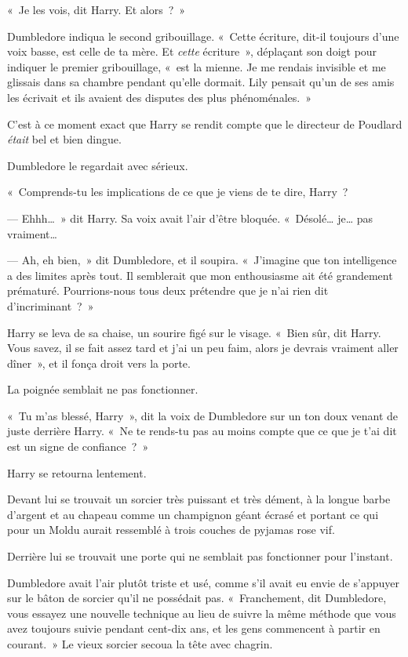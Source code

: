 «~Je les vois, dit Harry.
Et alors~?~»

Dumbledore indiqua le second gribouillage.
«~Cette écriture, dit-il toujours d'une voix basse, est celle de ta mère.
Et \emph{cette} écriture~», déplaçant son doigt pour indiquer le premier gribouillage, «~est la mienne.
Je me rendais invisible et me glissais dans sa chambre pendant qu'elle dormait.
Lily pensait qu'un de ses amis les écrivait et ils avaient des disputes des plus phénoménales.~»

C'est à ce moment exact que Harry se rendit compte que le directeur de Poudlard \emph{était} bel et bien dingue.

Dumbledore le regardait avec sérieux.

«~Comprends-tu les implications de ce que je viens de te dire, Harry~?

--- Ehhh…~»
dit Harry.
Sa voix avait l'air d'être bloquée.
«~Désolé… je… pas vraiment…

--- Ah, eh bien,~» dit Dumbledore, et il soupira.
«~J'imagine que ton intelligence a des limites après tout.
Il semblerait que mon enthousiasme ait été grandement prématuré.
Pourrions-nous tous deux prétendre que je n'ai rien dit d'incriminant~?~»

Harry se leva de sa chaise, un sourire figé sur le visage.
«~Bien sûr, dit Harry.
Vous savez, il se fait assez tard et j'ai un peu faim, alors je devrais vraiment aller dîner~», et il fonça droit vers la porte.

La poignée semblait ne pas fonctionner.

«~Tu m'as blessé, Harry~», dit la voix de Dumbledore sur un ton doux venant de juste derrière Harry.
«~Ne te rends-tu pas au moins compte que ce que je t'ai dit est un signe de confiance~?~»

Harry se retourna lentement.

Devant lui se trouvait un sorcier très puissant et très dément, à la longue barbe d'argent et au chapeau comme un champignon géant écrasé et portant ce qui pour un Moldu aurait ressemblé à trois couches de pyjamas rose vif.

Derrière lui se trouvait une porte qui ne semblait pas fonctionner pour l'instant.

Dumbledore avait l'air plutôt triste et usé, comme s'il avait eu envie de s'appuyer sur le bâton de sorcier qu'il ne possédait pas.
«~Franchement, dit Dumbledore, vous essayez une nouvelle technique au lieu de suivre la même méthode que vous avez toujours suivie pendant cent-dix ans, et les gens commencent à partir en courant.~»
Le vieux sorcier secoua la tête avec chagrin.

